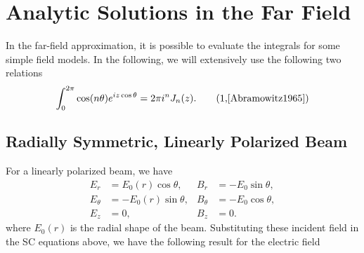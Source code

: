 \documentclass[11pt,SymmetricalJury]{inrsthesis/inrsthesis}
\begin{document}
\section{Analytic Solutions in the Far Field}
In the far-field approximation, it is possible to evaluate the integrals
for some simple field models. In the following, we will extensively use the
following two relations
  \begin{equation}
    \stepcounter{equation}
    \int_0^{2\pi} \cos(n\theta)e^{iz\cos\theta}= 2\pi i^n J_n(z). \tag{\theequation,\cite[\S9.1.21]{Abramowitz1965}}
    \label{eq:app.integral-bessel}
  \end{equation}

\subsection{Radially Symmetric, Linearly Polarized Beam}
For a linearly polarized beam, we have
  \begin{subequations}
  \begin{align}
    E_r       &= E_0(r)\cos\theta ,  & B_r      &= -E_0\sin\theta, \\
    E_\theta  &= -E_0(r)\sin\theta,  & B_\theta &= -E_0\cos\theta, \\
    E_z       &= 0                ,  & B_z      &=  0.
  \end{align}
  \end{subequations}
where $E_0(r)$ is the radial shape of the beam.
Substituting these incident field in the SC equations above, we have the following
result for the electric field
\end{document}
